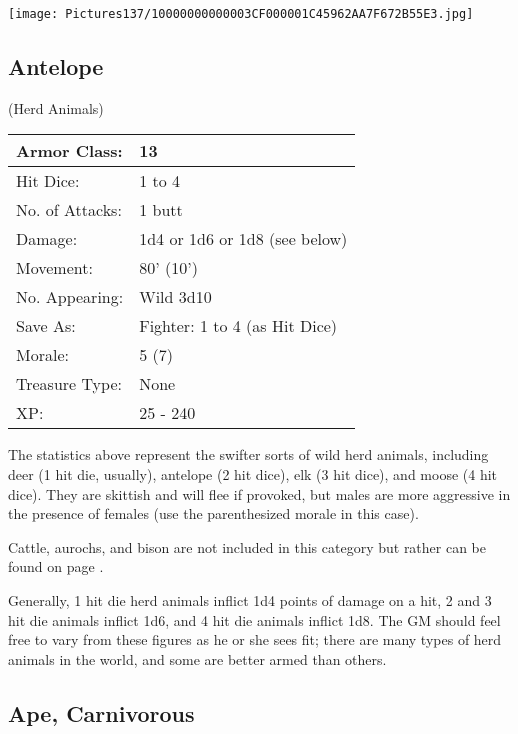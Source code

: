 \documentclass[a4paper,twoside,openany,10pt]{book}
\begin{document}
\begin{multicols}{2}
\vfill

\begin{center}
	\texttt{[image: Pictures137/10000000000003CF000001C45962AA7F672B55E3.jpg]}
\end{center}

\columnbreak

\subsection*{Antelope}(Herd Animals)\label{antelope}

\begin{tabularx}{0.48\textwidth}{ll}
Armor Class: & 13 \\\hline
Hit Dice: & 1 to 4 \\\hline
No. of Attacks: & 1 butt \\\hline
Damage: & 1d4 or 1d6 or 1d8 (see below) \\\hline
Movement: & 80' (10') \\\hline
No. Appearing: & Wild 3d10 \\\hline
Save As: & Fighter: 1 to 4 (as Hit Dice) \\\hline
Morale: & 5 (7) \\\hline
Treasure Type: & None \\\hline
XP: & 25 - 240 \\\hline
\end{tabularx}\medskip

The statistics above represent the swifter sorts of wild herd animals, including deer (1 hit die, usually), antelope (2 hit dice), elk (3 hit dice), and moose (4 hit dice). They are skittish and will flee if provoked, but males are more aggressive in the presence of females (use the parenthesized morale in this case).

Cattle, aurochs, and bison are not included in this category but rather can be found on page \hyperlink{cattle-including-aurochs-and-bison}{\pageref{cattle-including-aurochs-and-bison}}. 

Generally, 1 hit die herd animals inflict 1d4 points of damage on a hit, 2 and 3 hit die animals inflict 1d6, and 4 hit die animals inflict 1d8. The GM should feel free to vary from these figures as he or she sees fit; there are many types of herd animals in the world, and some are better armed than others.

\subsection*{Ape, Carnivorous}\label{ape-carnivorous}


\end{multicols}
\end{document}
